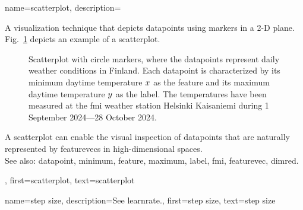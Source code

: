 {name={scatterplot}, 
	description={A 
		visualization technique that depicts \glspl{datapoint} using markers in a 2-D plane. 
		Fig.\ \ref{fig_scatterplot_temp_FMI_dict} depicts an example of a scatterplot.  
		\begin{figure}[H]
			\begin{center}
				\vspace*{-10mm}
			\end{center}
		\caption{Scatterplot with circle markers, where the \glspl{datapoint} represent daily weather conditions in Finland. 
			Each \gls{datapoint} is characterized by its \gls{minimum} daytime temperature $x$ 
			as the \gls{feature} and its \gls{maximum} daytime temperature $y$ as the \gls{label}. 
			The temperatures have been measured at the \gls{fmi} weather station Helsinki Kaisaniemi 
			during 1 September 2024—28 October 2024.}
			\label{fig_scatterplot_temp_FMI_dict}
			\vspace*{-3mm}
		\end{figure}
		A scatterplot can enable the visual inspection of \glspl{datapoint} that are naturally 
		represented by \glspl{featurevec} in high-dimensional spaces.
		\\
		See also: \gls{datapoint}, \gls{minimum}, \gls{feature}, \gls{maximum}, \gls{label}, \gls{fmi}, \gls{featurevec}, \gls{dimred}.},
	first={scatterplot},
	text={scatterplot} 
}

{name={step size}, 
	description={See \gls{learnrate}.}, 
	first={step size},
	text={step size} 
}

